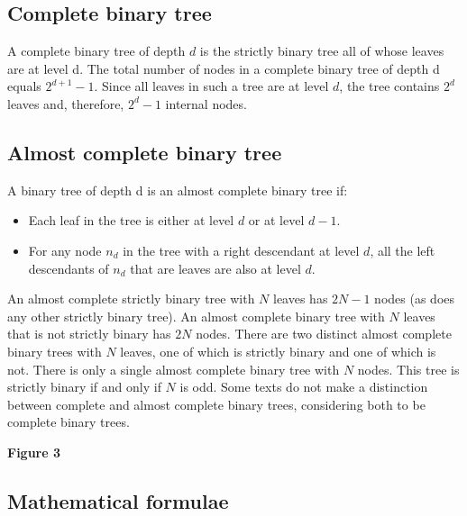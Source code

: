\documentclass{report}
\begin{document}
    \bigbreak \noindent 
    \subsection{Complete binary tree}
    \bigbreak \noindent 
    A complete binary tree of depth $d$ is the strictly binary tree all of whose leaves are at level d.
    \bigbreak \noindent 
    The total number of nodes in a complete binary tree of depth d equals $2^{d+1} -1 $. Since all leaves in such a tree are at level $d$, the tree contains $2^{d}$ leaves and, therefore, $2^{d}-1$ internal nodes.
    \bigbreak \noindent 
    \bigbreak \noindent 
    \subsection{Almost complete binary tree}
    \bigbreak \noindent 
    A binary tree of depth d is an almost complete binary tree if:
    \begin{itemize}
        \item Each leaf in the tree is either at level $d$ or at level $d-1$.
        \item For any node $n_{d}$ in the tree with a right descendant at level $d$, all the left descendants of $n_{d}$ that are leaves are also at level $d$.
    \end{itemize}
    \bigbreak \noindent 
    An almost complete strictly binary tree with $N$ leaves has $2N-1$ nodes (as does any other strictly binary tree). An almost complete binary tree with $N$ leaves that is not strictly binary has $2N$ nodes. There are two distinct almost complete binary trees with $N$ leaves, one of which is strictly binary and one of which is not.
    \bigbreak \noindent 
    There is only a single almost complete binary tree with $N$ nodes. This tree is strictly binary if and only if $N$ is odd.
    \bigbreak \noindent 
    Some texts do not make a distinction between complete and almost complete binary trees, considering both to be complete binary trees.
    \bigbreak \noindent 
    \begin{center}
        \textbf{Figure 3}
    \end{center}
    \bigbreak \noindent 
    \subsection{Mathematical formulae}
    \bigbreak \noindent 
\end{document}
